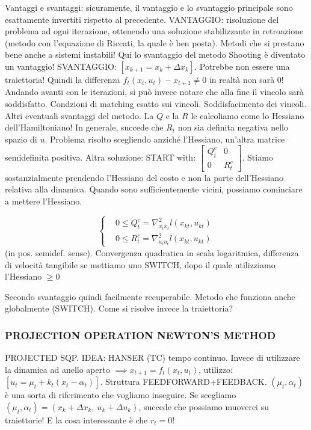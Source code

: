 Vantaggi e svantaggi: sicuramente, il vantaggio e lo svantaggio principale sono esattamente invertiti rispetto al precedente. VANTAGGIO: risoluzione del problema ad ogni iterazione, ottenendo una soluzione stabilizzante in retroazione (metodo con l'equazione di Riccati, la quale è ben posta). Metodi che si prestano bene anche a sistemi instabili! Qui lo svantaggio del metodo Shooting è diventato un vantaggio!
SVANTAGGIO: $[x_{k+1} = x_k + \Delta x_k]$. Potrebbe non essere una traiettoria! Quindi la differenza $f_t(x_t,u_t) - x_{t+1} \neq 0$ in realtà non sarà 0! Andando avanti con le iterazioni, si può invece notare che alla fine il vincolo sarà soddisfatto. Condzioni di matching esatto sui vincoli. Soddisfacimento dei vincoli.
Altri eventuali svantaggi del metodo. La $Q$ e la $R$ le calcoliamo come lo Hessiano dell'Hamiltoniano! In generale, succede che $R_t$ non sia definita negativa nello spazio di $u$. Problema risolto scegliendo anziché l'Hessiano, un'altra matrice semidefinita positiva. Altra soluzione: START with: $\begin{bmatrix}Q^c_t&0\\0&R^c_t\end{bmatrix}$. Stiamo sostanzialmente prendendo l'Hessiano del costo e non la parte dell'Hessiano relativa alla dinamica. Quando sono sufficientemente vicini, possiamo cominciare a mettere l'Hessiano.

\[
	\left\{
	\begin{aligned}
	&0\leq Q^c_t = \nabla^2_{x_tx_t}{l(x_{kt},u_{kt})}\\
	&0\leq R^c_t = \nabla^2_{u_tu_t}{l(x_{kt},u_{kt})}
	\end{aligned}
	\right.
\]
(in pos. semidef. sense). Convergenza quadratica in scala logaritmica, differenza di velocità tangibile se mettiamo uno SWITCH, dopo il quale utilizziamo l'Hessiano $\geq 0$

Secondo svantaggio quindi facilmente recuperabile. Metodo che funziona anche globalmente (SWITCH). Come si risolve invece la traiettoria?

\subsubsection{PROJECTION OPERATION NEWTON'S METHOD}

PROJECTED SQP. IDEA: HANSER (TC) tempo continuo. Invece di utilizzare la dinamica ad anello aperto $\implies x_{t+1}=f_t(x_t,u_t)$, utilizzo: $[u_t = \mu_t + k_t(x_t-\alpha_t)]$. Struttura FEEDFORWARD+FEEDBACK. $(\mu_t,\alpha_t)$ è una sorta di riferimento che vogliamo inseguire. Se scegliamo $(\mu_t,\alpha_t) = (x_k+\Delta x_k,\ u_k+\Delta u_k)$, succede che possiamo muoverci su traiettorie! E la cosa interessante è che $r_t = 0$!

